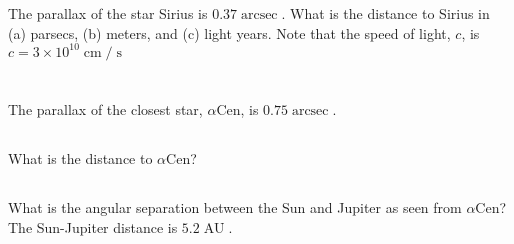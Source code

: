 \documentclass[11pt]{scrartcl}
\DeclareMathOperator{\AU}{AU}
\DeclareMathOperator{\arcsec}{arcsec}
\DeclareMathOperator{\cm}{cm}
\DeclareMathOperator{\s}{s}
\newcommand\pow[2]{\ensuremath{#1 \times 10^{#2}}}
\begin{document}
\section{}

The parallax of the star Sirius is $0.37\arcsec$. What is the distance to Sirius  in (a) parsecs, (b) meters, and (c) light years. Note that the speed of light, $c$, is $c = \pow{3}{10}\cm/\s$


\section{}

The parallax of the closest star, $\alpha$Cen, is $0.75\arcsec$.

\subsection{}

What is the distance to $\alpha$Cen?

\subsection{}

What is the angular separation between the Sun and Jupiter as seen from $\alpha$Cen? The Sun-Jupiter distance is $5.2\AU$.
\end{document}

